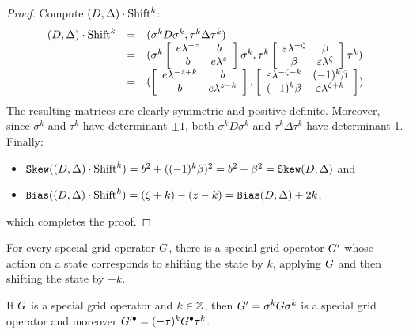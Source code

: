 \begin{proof}
Compute $(D,\Delta)\cdot\mbox{Shift}^k$:
\[
\begin{array}{rcl}
(D,\Delta)\cdot\mbox{Shift}^k & = & (\sigma^k D \sigma^k, \tau^k \Delta \tau^k) \\
& = & (\sigma^k\left[ \begin{array} {cc} 
e{\lambda^{-z}} & b \\
b & e{\lambda^{z}}
\end{array} \right] \sigma^k,
\tau^k\left[ \begin{array} {cc} 
\varepsilon{\lambda^{-\zeta}} & \beta \\
\beta & \varepsilon{\lambda^{\zeta}}
\end{array} \right]\tau^k) \\
& = & (\left[ \begin{array} {cc} 
e\lambda^{-z+k} & b \\
b & e\lambda^{z-k}
\end{array} \right],
\left[ \begin{array} {cc} 
\varepsilon\lambda^{-\zeta-k} & (-1)^k\beta \\
(-1)^k\beta & \varepsilon\lambda^{\zeta+k}
\end{array} \right])
\end{array}
\]
The resulting matrices are clearly symmetric and positive definite. Moreover, since $\sigma^k$ and $\tau^k$ have determinant $\pm 1$, both $\sigma^k D\sigma^k$ and $\tau^k \Delta\tau^k$ have determinant 1. Finally:
\begin{itemize}
  \item $\mathtt{Skew}((D,\Delta)\cdot\mbox{Shift}^k)= b^2+((-1)^k\beta)^2=b^2+\beta^2= \mathtt{Skew}(D,\Delta)$ and
  \item $\mathtt{Bias}((D,\Delta)\cdot\mbox{Shift}^k)=(\zeta+k)-(z-k)=\mathtt{Bias}(D,\Delta) +2k$,
\end{itemize}
which completes the proof.
\end{proof}

For every special grid operator $G$, there is a special grid operator $G'$ whose action on a state corresponds to shifting the state by $k$, applying $G$ and then shifting the state by $-k$.

\begin{lemma}
\label{conjugationbysigma1}
If $G$ is a special grid operator and $k\in\mathbb{Z}$, then $G'=\sigma^k G \sigma^k$ is a special grid operator and moreover $G'^\bullet = (-\tau)^k G^\bullet \tau^k$.
\end{lemma}

